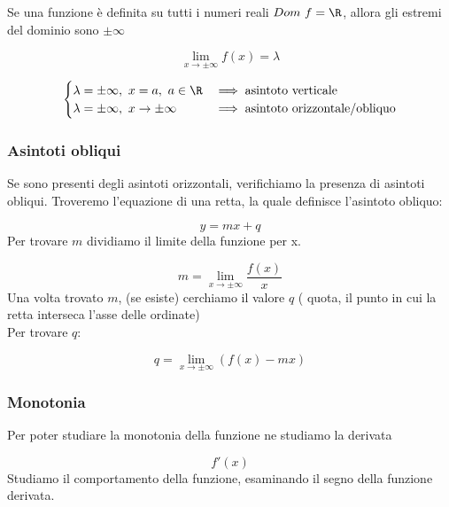 \documentclass[../analisi.tex]{subfiles}
\begin{document}
\begin{esem}
	Se una funzione è definita su tutti i numeri reali $Dom\ f = \R $, allora
	gli estremi del dominio sono $ \pm \infty $


	\begin{equation}
		\lim_{x \to \pm\infty} f(x) = \lambda
	\end{equation}
	
	\begin{equation}
		\begin{cases}
			\lambda=\pm \infty,\ x = a,\ a \in \R & \implies
			\text{asintoto verticale}\\
			\lambda=\pm \infty,\ x \to \pm\infty & \implies
			\text{asintoto orizzontale/obliquo}\\
		\end{cases}
	\end{equation}
\end{esem}

\subsubsection{Asintoti obliqui}
Se sono presenti degli asintoti orizzontali, verifichiamo la presenza di 
asintoti obliqui. Troveremo l'equazione di una retta, la quale 
definisce l'asintoto obliquo:

\begin{equation}
	y = mx + q
\end{equation}
Per trovare $ m $ dividiamo il limite della funzione per x.

\begin{equation}
	m = \lim_{x \to \pm\infty} \frac{f(x)}{x}  
\end{equation}
Una volta trovato $ m $, (se esiste) cerchiamo il valore $ q $ ( quota, 
il punto in cui la retta interseca l'asse delle ordinate)\\
Per trovare $ q $:


\begin{equation}
	q = \lim_{x \to \pm\infty} ( f(x) - mx ) 
\end{equation}
	

\subsubsection{Monotonia}
Per poter studiare la monotonia della funzione ne studiamo la derivata

\begin{equation}
	f' ( x ) 
\end{equation}
Studiamo il comportamento della funzione, esaminando il segno della funzione
derivata.
\end{document}
